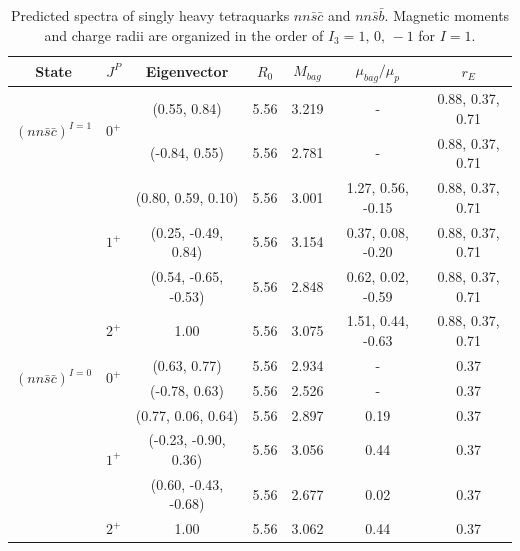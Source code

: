 \documentclass[prd,twocolumn,floatfix,nofootinbib]{revtex4}
\begin{document}
\renewcommand{\tabcolsep}{0.62cm}
\renewcommand{\arraystretch}{1.3}
\begin{table}[!htbp]
    \caption{Predicted spectra of singly heavy tetraquarks $nn\bar{s}\bar{c}$ and $nn\bar{s}\bar{b}$. 
    Magnetic moments and charge radii are organized in the order of $I_{3}=1,\,0,\,-1$ for $I=1$.}
    \label{tab:1heavytetraquark}
    \begin{tabular}{ccccccc}
        \hline\hline
        {\rm State}     &$J^{P}$    &{\rm Eigenvector}      &$R_{0}$    &$M_{bag}$  &$\mu_{bag}/\mu_{p}$    &$r_{E}$ \\ \hline
        \multirow{2}{*}{${(nn\bar{s}\bar{c})}^{I=1}$}
                        &\multirow{2}{*}{$0^{+}$}
                                    &(0.55, 0.84)           &5.56	    &3.219	    &-                      &0.88, 0.37, 0.71 \\ 
                        &           &(-0.84, 0.55)          &5.56	    &2.781	    &-                      &0.88, 0.37, 0.71 \\ 
                        &\multirow{3}{*}{$1^{+}$}
                                    &(0.80, 0.59, 0.10)     &5.56	    &3.001	    &1.27, 0.56, -0.15      &0.88, 0.37, 0.71 \\ 
                        &           &(0.25, -0.49, 0.84)    &5.56	    &3.154	    &0.37, 0.08, -0.20      &0.88, 0.37, 0.71 \\ 
                        &           &(0.54, -0.65, -0.53)   &5.56	    &2.848	    &0.62, 0.02, -0.59      &0.88, 0.37, 0.71 \\ 
                        &$2^{+}$    &1.00                   &5.56	    &3.075	    &1.51, 0.44, -0.63      &0.88, 0.37, 0.71 \\ 
        \multirow{2}{*}{${(nn\bar{s}\bar{c})}^{I=0}$}
                        &\multirow{2}{*}{$0^{+}$}
                                    &(0.63, 0.77)           &5.56	    &2.934	    &-                      &0.37 \\ 
                        &           &(-0.78, 0.63)          &5.56	    &2.526	    &-                      &0.37 \\ 
                        &\multirow{3}{*}{$1^{+}$}
                                    &(0.77, 0.06, 0.64)     &5.56	    &2.897	    &0.19                   &0.37 \\ 
                        &           &(-0.23, -0.90, 0.36)   &5.56	    &3.056	    &0.44                   &0.37 \\ 
                        &           &(0.60, -0.43, -0.68)   &5.56	    &2.677	    &0.02                   &0.37 \\ 
                        &$2^{+}$    &1.00                   &5.56	    &3.062	    &0.44                   &0.37 \\ 


\end{tabular}
\end{table}
\end{document}
